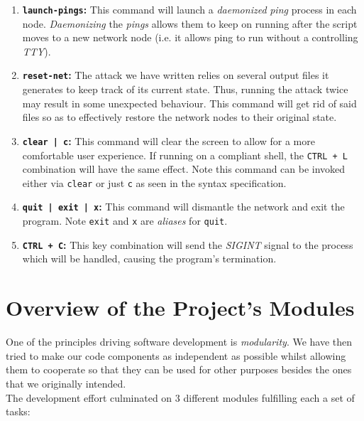 \begin{enumerate}
                    \item \textbf{\texttt{launch-pings}:} This command will launch a \textit{daemonized} \textit{ping} process in each node. \textit{Daemonizing} the \textit{pings} allows them to keep on running after the script moves to a new network node (i.e. it allows ping to run without a controlling \textit{TTY}).
                    \item \textbf{\texttt{reset-net}:} The attack we have written relies on several output files it generates to keep track of its current state. Thus, running the attack twice may result in some unexpected behaviour. This command will get rid of said files so as to effectively restore the network nodes to their original state.
                    \item \textbf{\texttt{clear | c}:} This command will clear the screen to allow for a more comfortable user experience. If running on a compliant shell, the \texttt{CTRL + L} combination will have the same effect. Note this command can be invoked either via \texttt{clear} or just \texttt{c} as seen in the syntax specification.
                    \item \textbf{\texttt{quit | exit | x}:} This command will dismantle the network and exit the program. Note \texttt{exit} and \texttt{x} are \textit{aliases} for \texttt{quit}.
                    \item \textbf{\texttt{CTRL + C}:} This key combination will send the \textit{SIGINT} signal to the process which will be handled, causing the program's termination.
                \end{enumerate}

    \section{Overview of the Project's Modules}
        One of the principles driving software development is \textit{modularity}. We have then tried to make our code components as independent as possible whilst allowing them to cooperate so that they can be used for other purposes besides the ones that we originally intended.\\

        The development effort culminated on $3$ different modules fulfilling each a set of tasks:

